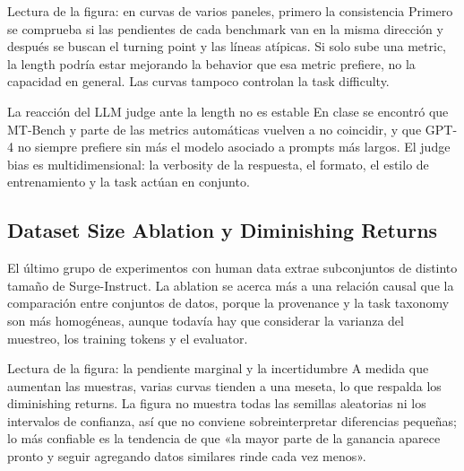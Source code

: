 \begin{knowledgebox}{Lectura de la figura: en curvas de varios paneles, primero la consistencia}
Primero se comprueba si las pendientes de cada benchmark van en la misma dirección y después se buscan el turning point y las líneas atípicas. Si solo sube una metric, la length podría estar mejorando la behavior que esa metric prefiere, no la capacidad en general. Las curvas tampoco controlan la task difficulty.
\end{knowledgebox}


\begin{warningbox}{La reacción del LLM judge ante la length no es estable}
En clase se encontró que MT-Bench y parte de las metrics automáticas vuelven a no coincidir, y que GPT-4 no siempre prefiere sin más el modelo asociado a prompts más largos. El judge bias es multidimensional: la verbosity de la respuesta, el formato, el estilo de entrenamiento y la task actúan en conjunto.
\end{warningbox}

\subsection{Dataset Size Ablation y Diminishing Returns}

El último grupo de experimentos con human data extrae subconjuntos de distinto tamaño de Surge-Instruct. La ablation se acerca más a una relación causal que la comparación entre conjuntos de datos, porque la provenance y la task taxonomy son más homogéneas, aunque todavía hay que considerar la varianza del muestreo, los training tokens y el evaluator.


\begin{knowledgebox}{Lectura de la figura: la pendiente marginal y la incertidumbre}
A medida que aumentan las muestras, varias curvas tienden a una meseta, lo que respalda los diminishing returns. La figura no muestra todas las semillas aleatorias ni los intervalos de confianza, así que no conviene sobreinterpretar diferencias pequeñas; lo más confiable es la tendencia de que «la mayor parte de la ganancia aparece pronto y seguir agregando datos similares rinde cada vez menos».
\end{knowledgebox}

